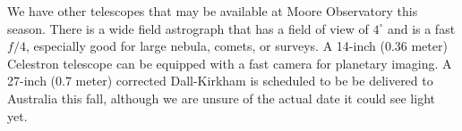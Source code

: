 \documentclass[dvips,12pt]{article}
\begin{document}
We have other telescopes that may be available at Moore Observatory this season.
There is a wide field astrograph that has a field of view of $4^\circ$ and is a
fast $f/4$,  especially good for large nebula, comets, or surveys.  A 14-inch
(0.36 meter) Celestron  telescope can be equipped with a fast camera for
planetary imaging.  A 27-inch (0.7 meter)  corrected Dall-Kirkham is scheduled
to be be delivered to Australia this fall, although we are unsure of the actual
date it could see light yet.  


 
\begin{thebibliography}{99}


\end{thebibliography}
\end{document}
